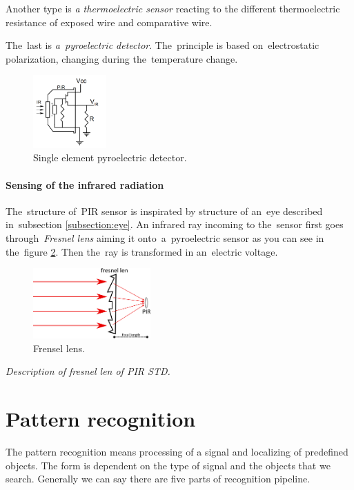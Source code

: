 Another type is {\it a thermoelectric sensor} reacting to the different thermoelectric resistance of
exposed wire and comparative wire.

The~last is {\it a~pyroelectric detector}. The~principle is based on~electrostatic polarization,
changing during the~temperature change. \cite{DetectorsBook}

\begin{figure}[h!]
\begin{center}
\includegraphics[width=0.25\textwidth]{obrazky-figures/pirscheme.png}
\caption{Single element pyroelectric detector.\cite{an2105}\label{fig:pir}}
\end{center}    
\end{figure}


\paragraph{Sensing of the infrared radiation}
The~structure of~PIR sensor is inspirated by structure of an~eye described in~subsection \ref{subsection:eye}.
An infrared ray incoming to the~sensor first goes through~{\it Fresnel lens} aiming it onto~a~pyroelectric sensor
as you can see in the~figure \ref{fig:fresnellens}. Then the~ray is transformed in an~electric voltage.

\begin{figure}[h!]
\begin{center}
\includegraphics[width=0.4\textwidth]{obrazky-figures/fresnellens.png}
\caption{Frensel lens.\label{fig:fresnellens}}
\end{center}
\end{figure}

{\it Description of fresnel len of PIR STD.}



\newpage
\section{Pattern recognition}
The pattern recognition means processing of a signal and localizing of predefined objects.
The form is dependent on the type of signal and the objects that we search. Generally we can say
there are five parts of recognition pipeline.

